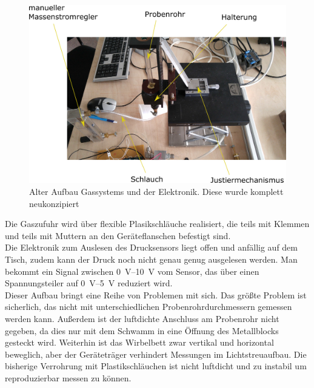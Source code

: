 \begin{figure}[h]
	\begin{center}
		\includegraphics[scale=0.7]{Altes_Wirbelbett_oben.png}
		\caption[Alter Aufbau 1]{Alter Aufbau Gassystems und der Elektronik. Diese wurde komplett neukonzipiert}
	\end{center}
\end{figure}	


Die Gaszufuhr wird über flexible Plasikschläuche realisiert, die teils mit Klemmen und teils mit Muttern an den Geräteflanschen befestigt sind. \\
Die Elektronik zum Auslesen des Drucksensors liegt offen und anfällig auf dem Tisch, zudem kann der Druck noch nicht genau genug ausgelesen werden. Man bekommt ein Signal zwischen \SIrange{0}{10}{\volt} vom Sensor, das über einen Spannungsteiler auf \SIrange{0}{5}{\volt} reduziert wird. \\
Dieser Aufbau bringt eine Reihe von Problemen mit sich. Das größte Problem ist sicherlich, das nicht mit unterschiedlichen Probenrohrdurchmessern gemessen werden kann. Außerdem ist der luftdichte Anschluss am Probenrohr nicht gegeben, da dies nur mit dem Schwamm in eine Öffnung des Metallblocks gesteckt wird.
Weiterhin ist das Wirbelbett zwar vertikal und horizontal beweglich, aber der Geräteträger verhindert Messungen im Lichtstreuaufbau.
Die bisherige Verrohrung mit Plastikschläuchen ist nicht luftdicht und zu instabil um reproduzierbar messen zu können. \\


